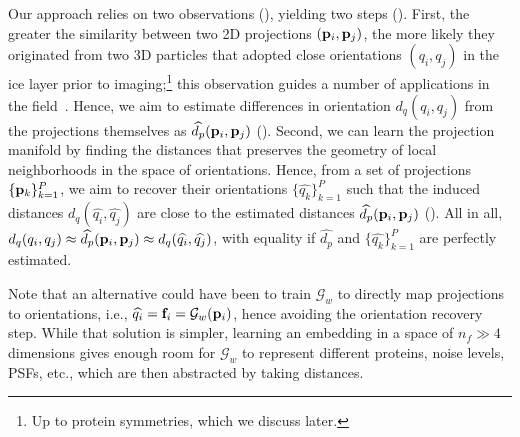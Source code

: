 Our approach relies on two observations (), yielding two steps ().
First, the greater the similarity between two 2D projections $(\mathbf{p}_i, \mathbf{p}_j)$, the more likely they originated from two 3D particles that adopted close orientations $(q_i, q_j)$ in the ice layer prior to imaging;\footnote{Up to protein symmetries, which we discuss later.} this observation guides a number of applications in the field~\cite{frank2006three}.
Hence, we aim to estimate differences in orientation $d_q(q_i, q_j)$ from the projections themselves as $\widehat{d_p}(\mathbf{p}_i, \mathbf{p}_j)$ ().
Second, we can learn the projection manifold by finding the distances that preserves the geometry of local neighborhoods in the space of orientations.
Hence, from a set of projections $\{\mathbf{p}_k\}_{k=1}^P$, we aim to recover their orientations $\{\widehat{q_k}\}_{k=1}^P$ such that the induced distances $d_q(\widehat{q_i}, \widehat{q_j})$ are close to the estimated distances $\widehat{d_p}(\mathbf{p}_i, \mathbf{p}_j)$ ().
All in all, $d_q(q_i, q_j) \approx \widehat{d_p}(\mathbf{p}_i, \mathbf{p}_j) \approx d_q(\widehat{q_i}, \widehat{q_j})$, with equality if $\widehat{d_p}$ and $\{\widehat{q_k}\}_{k=1}^P$ are perfectly estimated.

Note that an alternative could have been to train $\mathcal{G}_w$ to directly map projections to orientations, i.e., $\widehat{q_i} = \mathbf{f}_i = \mathcal{G}_w(\mathbf{p}_i)$, hence avoiding the orientation recovery step.
While that solution is simpler, learning an embedding in a space of $n_f \gg 4$ dimensions gives  enough room for $\mathcal{G}_w$ to represent different proteins, noise levels, PSFs, etc., which are then abstracted by taking distances.

